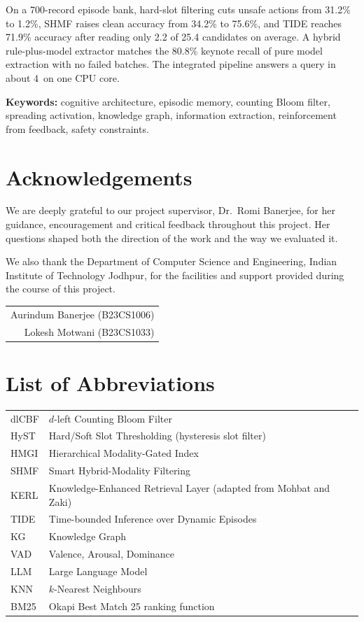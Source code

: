 \documentclass[12pt,a4paper,oneside]{report}
\newcommand{\ms}{\,\text{ms}}
\begin{document}
On a 700-record episode bank, hard-slot filtering cuts unsafe actions from 31.2\% to 1.2\%, SHMF raises clean accuracy from 34.2\% to 75.6\%, and TIDE reaches 71.9\% accuracy after reading only 2.2 of 25.4 candidates on average. A hybrid rule-plus-model extractor matches the 80.8\% keynote recall of pure model extraction with no failed batches. The integrated pipeline answers a query in about 4\ms{} on one CPU core.

\vspace{0.5em}
\noindent\textbf{Keywords:} cognitive architecture, episodic memory, counting Bloom filter, spreading activation, knowledge graph, information extraction, reinforcement from feedback, safety constraints.

\clearpage
\chapter*{Acknowledgements}
We are deeply grateful to our project supervisor, Dr.\ Romi Banerjee, for her guidance, encouragement and critical feedback throughout this project. Her questions shaped both the direction of the work and the way we evaluated it.

We also thank the Department of Computer Science and Engineering, Indian Institute of Technology Jodhpur, for the facilities and support provided during the course of this project.

\vspace{1.5cm}
\hfill\begin{tabular}{r}
Aurindum Banerjee (B23CS1006)\\
Lokesh Motwani (B23CS1033)
\end{tabular}

\clearpage
\tableofcontents
\clearpage
\listoffigures
\clearpage
\listoftables
\clearpage

\chapter*{List of Abbreviations}
\begin{tabular}{@{}p{2.6cm}l@{}}
dlCBF & $d$-left Counting Bloom Filter\\
HyST & Hard/Soft Slot Thresholding (hysteresis slot filter)\\
HMGI & Hierarchical Modality-Gated Index\\
SHMF & Smart Hybrid-Modality Filtering\\
KERL & Knowledge-Enhanced Retrieval Layer (adapted from Mohbat and Zaki)\\
TIDE & Time-bounded Inference over Dynamic Episodes\\
KG & Knowledge Graph\\
VAD & Valence, Arousal, Dominance\\
LLM & Large Language Model\\
KNN & $k$-Nearest Neighbours\\
BM25 & Okapi Best Match 25 ranking function\\
\end{tabular}
\end{document}
